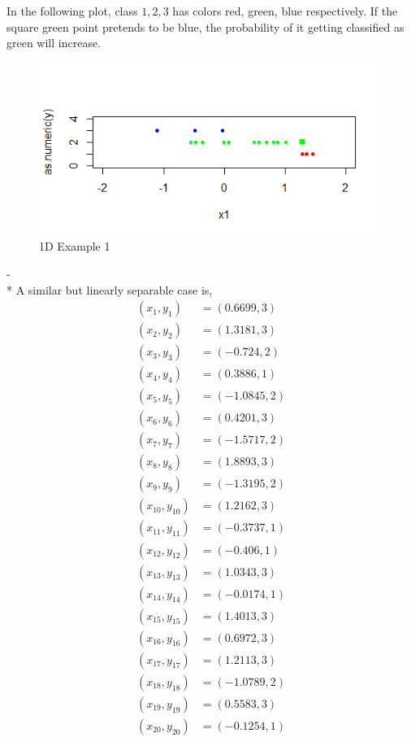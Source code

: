 \documentclass{article}
\begin{document}
In the following plot, class $1, 2, 3$ has colors red, green, blue respectively. If the square green point pretends to be blue, the probability of it getting classified as green will increase.
\begin{figure}[H]
\centering
\includegraphics[width=0.5\linewidth]{test1d_421}
\caption{1D Example 1}
\end{figure}
 -
\\* A similar but linearly separable case is,
\begin{align*}
\left(x_{1}, y_{1}\right) &= \left(0.6699,3\right)
\\ \left(x_{2}, y_{2}\right) &= \left(1.3181,3\right)
\\ \left(x_{3}, y_{3}\right) &= \left(-0.724,2\right)
\\ \left(x_{4}, y_{4}\right) &= \left(0.3886,1\right)
\\ \left(x_{5}, y_{5}\right) &= \left(-1.0845,2\right)
\\ \left(x_{6}, y_{6}\right) &= \left(0.4201,3\right)
\\ \left(x_{7}, y_{7}\right) &= \left(-1.5717,2\right)
\\ \left(x_{8}, y_{8}\right) &= \left(1.8893,3\right)
\\ \left(x_{9}, y_{9}\right) &= \left(-1.3195,2\right)
\\ \left(x_{10}, y_{10}\right) &= \left(1.2162,3\right)
\\ \left(x_{11}, y_{11}\right) &= \left(-0.3737,1\right)
\\ \left(x_{12}, y_{12}\right) &= \left(-0.406,1\right)
\\ \left(x_{13}, y_{13}\right) &= \left(1.0343,3\right)
\\ \left(x_{14}, y_{14}\right) &= \left(-0.0174,1\right)
\\ \left(x_{15}, y_{15}\right) &= \left(1.4013,3\right)
\\ \left(x_{16}, y_{16}\right) &= \left(0.6972,3\right)
\\ \left(x_{17}, y_{17}\right) &= \left(1.2113,3\right)
\\ \left(x_{18}, y_{18}\right) &= \left(-1.0789,2\right)
\\ \left(x_{19}, y_{19}\right) &= \left(0.5583,3\right)
\\ \left(x_{20}, y_{20}\right) &= \left(-0.1254,1\right)
\end{align*}
\end{document}
